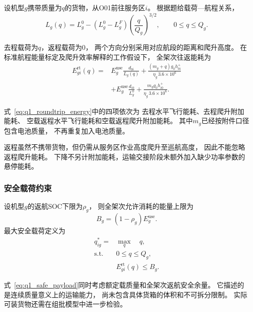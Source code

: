 \documentclass[bwprint]{gmcmthesis}
\begin{document}
设机型$g$携带质量为$q$的货物，从O01前往服务区$i$。
根据题给载荷—航程关系，
\begin{equation}
    L_g(q)
    =
    L_g^0-
    \left(L_g^0-L_g^F\right)
    \left(\frac{q}{Q_g}\right)^{3/2},
    \qquad 0\leq q\leq Q_g.
    \label{eq:q1_range}
\end{equation}

去程载荷为$q$，返程载荷为0，
两个方向分别采用对应航段的距离和爬升高度。
在标准航程能量标定及爬升效率解释的工作假设下，
全架次往返能耗为
\begin{equation}
\begin{aligned}
    E_{gi}^{\mathrm{rt}}(q)
    ={}&
    E_g^{\mathrm{use}}\frac{d_{0i}}{L_g(q)}
    +
    \frac{(m_g+q)g_0h_{0i}^{+}}
    {\eta_g\,3.6\times10^6}
    \\
    &+
    E_g^{\mathrm{use}}\frac{d_{i0}}{L_g^0}
    +
    \frac{m_g g_0h_{i0}^{+}}
    {\eta_g\,3.6\times10^6}.
\end{aligned}
\label{eq:q1_roundtrip_energy}
\end{equation}

式~\eqref{eq:q1_roundtrip_energy}中的四项依次为
去程水平飞行能耗、去程爬升附加能耗、
空载返程水平飞行能耗和空载返程爬升附加能耗。
其中$m_g$已经按附件口径包含电池质量，
不再重复加入电池质量。

返程虽然不携带货物，但仍需从服务区作业高度爬升至巡航高度，
因此不能忽略返程爬升能耗。
下降不另计附加能耗，运输交接阶段未额外加入缺少功率参数的悬停能耗。

\subsubsection{安全载荷约束}

设机型$g$的返航SOC下限为$\rho_g$，
则全架次允许消耗的能量上限为
\begin{equation}
    B_g=(1-\rho_g)E_g^{\mathrm{use}}.
\end{equation}
最大安全载荷定义为
\begin{equation}
\begin{aligned}
    q_{ig}^{*}
    ={}&\max_q \quad q,\\
    \text{s.t.}\quad
    &0\leq q\leq Q_g,\\
    &E_{gi}^{\mathrm{rt}}(q)\leq B_g.
\end{aligned}
\label{eq:q1_safe_payload}
\end{equation}

式~\eqref{eq:q1_safe_payload}同时考虑额定载质量和全架次返航安全余量。
它描述的是连续质量意义上的运输能力，
尚未包含具体货箱的体积和不可拆分限制。
实际可装货物还需在组批模型中进一步检验。
\end{document}
